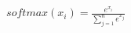 \documentclass[preview]{standalone}
\begin{document}
\begin{align*}
softmax(x_{i})=\frac{e^{x_{i}}}{\sum_{j=1}^{n}e^{x_{j}}}
\end{align*}
\end{document}
